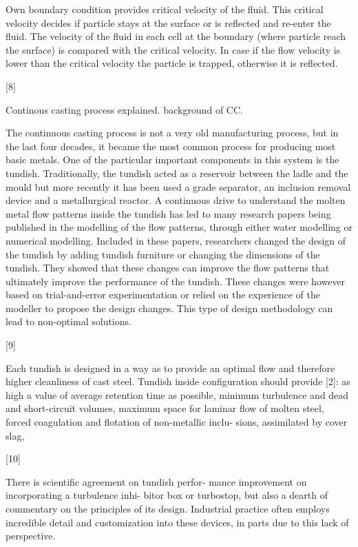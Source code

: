 Own boundary condition provides critical velocity of the
fluid. This critical velocity decides if particle stays at the surface
or is reflected and re-enter the fluid. The velocity of the fluid in
each cell at the boundary (where particle reach the surface)
is compared with the critical velocity. In case if the flow velocity
is lower than the critical velocity the particle is trapped, otherwise
it is reflected.

[8]

Continous casting process explained. background of CC.

The continuous casting process is not a very old manufacturing process, but in the last
four decades, it became the most common process for producing most basic metals.
One of the particular important components in this system is the tundish.
Traditionally, the tundish acted as a reservoir between the ladle and the mould but
more recently it has been used a grade separator, an inclusion removal device and a
metallurgical reactor.
A continuous drive to understand the molten metal flow
patterns inside the tundish has led to many research papers being published in the
modelling of the flow patterns, through either water modelling or numerical
modelling. Included in these papers, researchers changed the design of the tundish by
adding tundish furniture or changing the dimensions of the tundish. They showed that
these changes can improve the flow patterns that ultimately improve the performance
of the tundish. These changes were however based on trial-and-error experimentation
or relied on the experience of the modeller to propose the design changes. This type
of design methodology can lead to non-optimal solutions.

[9]

Each tundish is designed in a way as to provide an
optimal flow and therefore higher cleanliness of cast steel.
Tundish inside configuration should provide [2]:
as high a value of average retention time as possible,
minimum turbulence and dead and short-circuit volumes,
maximum space for laminar flow of molten steel,
forced coagulation and flotation of non-metallic inclu-
sions, assimilated by cover slag,

[10]

There is scientific agreement on tundish perfor-
mance improvement on incorporating a turbulence inhi-
bitor box or turbostop, but also a dearth of commentary on
the principles of its design. Industrial practice often
employs incredible detail and customization into these
devices, in parts due to this lack of perspective.

